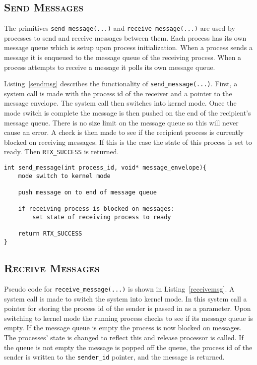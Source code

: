 \documentclass[oneside]{report}
\begin{document}
\subsection{\textsc{Send Messages}}
The primitives \texttt{send\_message(...)} and \texttt{receive\_message(...)}
are used by processes to send and receive messages between them. Each process
has its own message queue which is setup upon process initialization.
When a process sends a message it is enqueued to the message queue of the
receiving process. When a process attempts to receive a message it polls its
own message queue.

Listing~\ref{sendmsg} describes the functionality of
\texttt{send\_message(...)}.  First, a system call is made with the
process id of the receiver and a pointer to the message envelope. The
system call then switches into kernel mode. Once the mode switch is
complete the message is then pushed on the end of the recipient's
message queue. There is no size limit on the message queue so this
will never cause an error. A check is then made to see if the
recipient process is currently blocked on receiving messages. If this
is the case the state of this process is set to ready. Then
\texttt{RTX\_SUCCESS} is returned.

\begin{lstlisting}
int send_message(int process_id, void* message_envelope){
    mode switch to kernel mode

    push message on to end of message queue

    if receiving process is blocked on messages:
        set state of receiving process to ready

    return RTX_SUCCESS
}
\end{lstlisting}

\subsection{\textsc{Receive Messages}}
Pseudo code for \texttt{receive\_message(...)} is shown in
Listing~\ref{receivemsg}. A system call is made to switch the system
into kernel mode. In this system call a pointer for storing the
process id of the sender is passed in as a parameter. Upon switching
to kernel mode the running process checks to see if its message queue
is empty. If the message queue is empty the process is now blocked on
messages. The processes' state is changed to reflect this and release
processor is called. If the queue is not empty the message is popped
off the queue, the process id of the sender is written to the
\texttt{sender\_id} pointer, and the message is returned.
\end{document}
